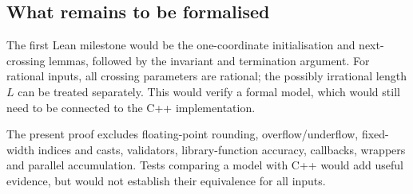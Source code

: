 \subsection{What remains to be formalised}
The first Lean milestone would be the one-coordinate initialisation and
next-crossing lemmas, followed by the invariant and termination argument.
For rational inputs, all crossing parameters are rational; the possibly
irrational length $L$ can be treated separately. This would verify a formal
model, which would still need to be connected to the C++ implementation.

The present proof excludes floating-point rounding, overflow/underflow,
fixed-width indices and casts, validators, library-function accuracy,
callbacks, wrappers and parallel accumulation. Tests comparing a model with
C++ would add useful evidence, but would not establish their equivalence
for all inputs.
